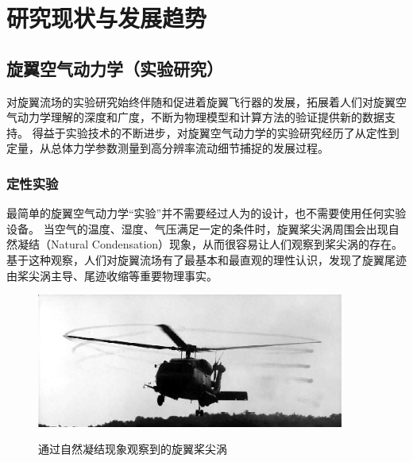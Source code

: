 \documentclass[doctor,openright,twoside,color]{buaathesis}
\begin{document}
\chapter{研究现状与发展趋势}

\section{旋翼空气动力学（实验研究）}
对旋翼流场的实验研究始终伴随和促进着旋翼飞行器的发展，拓展着人们对旋翼空气动力学理解的深度和广度，不断为物理模型和计算方法的验证提供新的数据支持。
得益于实验技术的不断进步，对旋翼空气动力学的实验研究经历了从定性到定量，从总体力学参数测量到高分辨率流动细节捕捉的发展过程。

\subsection{定性实验}
最简单的旋翼空气动力学“实验”并不需要经过人为的设计，也不需要使用任何实验设备。
当空气的温度、湿度、气压满足一定的条件时，旋翼桨尖涡周围会出现自然凝结（Natural Condensation）现象，从而很容易让人们观察到桨尖涡的存在。
基于这种观察，人们对旋翼流场有了最基本和最直观的理性认识，发现了旋翼尾迹由桨尖涡主导、尾迹收缩等重要物理事实。
\begin{figure}[h!]
  \centering
  \includegraphics[width=0.9\textwidth]{figures/natural-condensation.png}\\
  \caption{通过自然凝结现象观察到的旋翼桨尖涡}
\end{figure}
\end{document}
